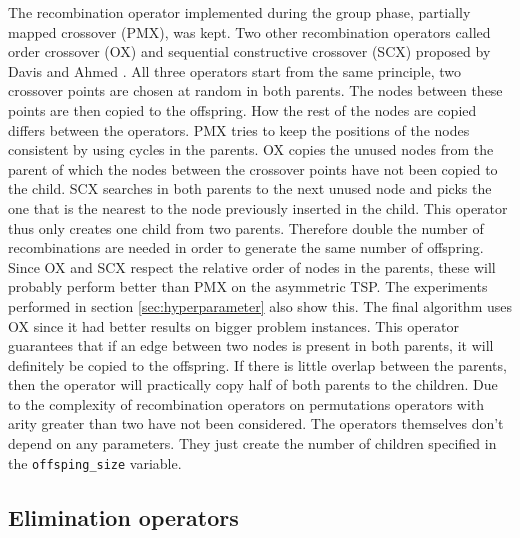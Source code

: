 \documentclass[a4paper,10pt]{article}
\newcommand{\ReplaceMe}[1]{{\color{blue}#1}}
\begin{document}
The recombination operator implemented during the group phase, partially mapped crossover (PMX), was kept. Two other recombination operators called order crossover (OX) and sequential constructive crossover (SCX) proposed by Davis \cite{davis} and Ahmed \cite{ahmed}. All three operators start from the same principle, two crossover points are chosen at random in both parents. The nodes between these points are then copied to the offspring. How the rest of the nodes are copied differs between the operators. PMX tries to keep the positions of the nodes consistent by using cycles in the parents. OX copies the unused nodes from the parent of which the nodes between the crossover points have not been copied to the child. SCX searches in both parents to the next unused node and picks the one that is the nearest to the node previously inserted in the child. This operator thus only creates one child from two parents. Therefore double the number of recombinations are needed in order to generate the same number of offspring.\\
Since OX and SCX respect the relative order of nodes in the parents, these will probably perform better than PMX on the asymmetric TSP. The experiments performed in section \ref{sec:hyperparameter} also show this. The final algorithm uses OX since it had better results on bigger problem instances. This operator guarantees that if an edge between two nodes is present in both parents, it will definitely be copied to the offspring. If there is little overlap between the parents, then the operator will practically copy half of both parents to the children. Due to the complexity of recombination operators on permutations operators with arity greater than two have not been considered. The operators themselves don't depend on any parameters. They just create the number of children specified in the \texttt{offsping\_size} variable.

\subsection{Elimination operators}

\end{document}
